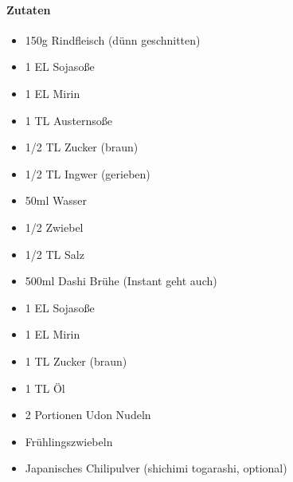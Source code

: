\newpage
{}

\paragraph{Zutaten}
\begin{itemize}[noitemsep]
	\item 150g Rindfleisch (dünn geschnitten)
	\item 1 EL Sojasoße
	\item 1 EL Mirin
	\item 1 TL Austernsoße
	\item 1/2 TL Zucker (braun)
	\item 1/2 TL Ingwer (gerieben)
	\item 50ml Wasser
	\item 1/2 Zwiebel 
	\item 1/2 TL Salz
	\vspace{0.5cm}
	\item 500ml Dashi Brühe (Instant geht auch)
	\item 1 EL Sojasoße
	\item 1 EL Mirin
	\item 1 TL Zucker (braun)
	\vspace{0.5cm}
	\item 1 TL Öl
	\item 2 Portionen Udon Nudeln
	\item Frühlingszwiebeln 
	\item Japanisches Chilipulver (shichimi togarashi, optional)
\end{itemize}

